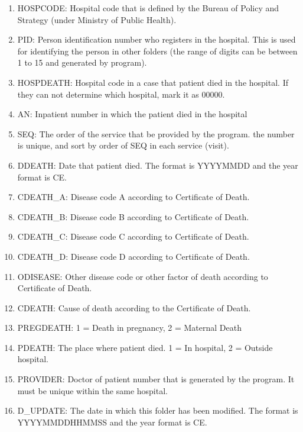 \begin{enumerate}
  \item HOSPCODE: Hospital code that is defined by the Bureau of Policy and Strategy (under Ministry of Public Health). 
  \item PID: Person identification number who registers in the hospital. This is used for identifying the person in other folders (the range of digits can be between 1 to 15 and generated by program).
  \item HOSPDEATH: Hospital code in a case that patient died in the hospital. If they can not determine which hospital, mark it as 00000.
  \item AN: Inpatient number in which the patient died in the hospital
  \item SEQ: The order of the service that be provided by the program. the number is unique, and sort by order of SEQ in each service (visit).
  \item DDEATH: Date that patient died. The format is YYYYMMDD and the year format is CE.
  \item CDEATH\_A: Disease code A according to Certificate of Death. 
  \item CDEATH\_B: Disease code B according to Certificate of Death.
  \item CDEATH\_C: Disease code C according to Certificate of Death.
  \item CDEATH\_D: Disease code D according to Certificate of Death.
  \item ODISEASE: Other disease code or other factor of death according to Certificate of Death.
  \item CDEATH: Cause of death according to the Certificate of Death.
  \item PREGDEATH: 1 = Death in pregnancy, 2 = Maternal Death
  \item PDEATH: The place where patient died. 1 = In hospital, 2 = Outside hospital.
  \item PROVIDER: Doctor of patient number that is generated by the program. It must be unique within the same hospital.
  \item D\_UPDATE: The date in which this folder has been modified. The format is YYYYMMDDHHMMSS and the year format is CE.
\end{enumerate}